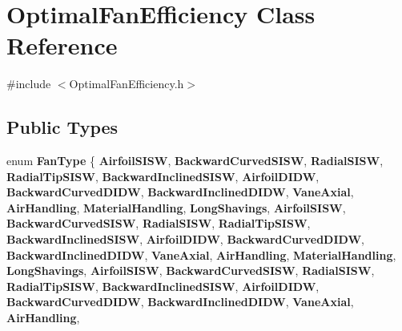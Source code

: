 \hypertarget{class_optimal_fan_efficiency}{}\section{Optimal\+Fan\+Efficiency Class Reference}
\label{class_optimal_fan_efficiency}


{\ttfamily \#include $<$Optimal\+Fan\+Efficiency.\+h$>$}

\subsection*{Public Types}
\begin{DoxyCompactItemize}
\item 
\mbox{\label{class_optimal_fan_efficiency_a468d7943ddcfc8678373762cd0641823}} 
enum {\bfseries Fan\+Type} \{ \newline
{\bfseries Airfoil\+S\+I\+SW}, 
{\bfseries Backward\+Curved\+S\+I\+SW}, 
{\bfseries Radial\+S\+I\+SW}, 
{\bfseries Radial\+Tip\+S\+I\+SW}, 
\newline
{\bfseries Backward\+Inclined\+S\+I\+SW}, 
{\bfseries Airfoil\+D\+I\+DW}, 
{\bfseries Backward\+Curved\+D\+I\+DW}, 
{\bfseries Backward\+Inclined\+D\+I\+DW}, 
\newline
{\bfseries Vane\+Axial}, 
{\bfseries Air\+Handling}, 
{\bfseries Material\+Handling}, 
{\bfseries Long\+Shavings}, 
\newline
{\bfseries Airfoil\+S\+I\+SW}, 
{\bfseries Backward\+Curved\+S\+I\+SW}, 
{\bfseries Radial\+S\+I\+SW}, 
{\bfseries Radial\+Tip\+S\+I\+SW}, 
\newline
{\bfseries Backward\+Inclined\+S\+I\+SW}, 
{\bfseries Airfoil\+D\+I\+DW}, 
{\bfseries Backward\+Curved\+D\+I\+DW}, 
{\bfseries Backward\+Inclined\+D\+I\+DW}, 
\newline
{\bfseries Vane\+Axial}, 
{\bfseries Air\+Handling}, 
{\bfseries Material\+Handling}, 
{\bfseries Long\+Shavings}, 
\newline
{\bfseries Airfoil\+S\+I\+SW}, 
{\bfseries Backward\+Curved\+S\+I\+SW}, 
{\bfseries Radial\+S\+I\+SW}, 
{\bfseries Radial\+Tip\+S\+I\+SW}, 
\newline
{\bfseries Backward\+Inclined\+S\+I\+SW}, 
{\bfseries Airfoil\+D\+I\+DW}, 
{\bfseries Backward\+Curved\+D\+I\+DW}, 
{\bfseries Backward\+Inclined\+D\+I\+DW}, 
\newline
{\bfseries Vane\+Axial}, 
{\bfseries Air\+Handling}, 

\end{DoxyCompactItemize}
